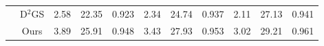 \documentclass[letterpaper]{article} %
\begin{document}
\begin{table}[ht!]
{\begin{tabular}{c c | ccc | ccc | ccc}
  

   
  & D$^2$GS    
      &\cellcolor{color_blue}2.58 &\cellcolor{blue!8}22.35 &\cellcolor{blue!8}0.923 
      &\cellcolor{color_blue}2.34 &\cellcolor{blue!8}24.74 &\cellcolor{blue!8}0.937 
      &\cellcolor{color_blue}2.11 &\cellcolor{blue!8}27.13 &\cellcolor{blue!8}0.941 \\  
        
  & Ours  
      &\cellcolor{blue!8}3.89 &\cellcolor{color_blue}25.91 &\cellcolor{color_blue}0.948 
      &\cellcolor{blue!8}3.43 &\cellcolor{color_blue}27.93 &\cellcolor{color_blue}0.953
      &\cellcolor{blue!8}3.02 &\cellcolor{color_blue}29.21 &\cellcolor{color_blue}0.961 \\  

\toprule     
       \end{tabular}
   }

\end{table}
\end{document}
